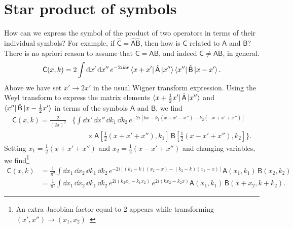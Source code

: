 \section{Star product of symbols}

How can we express the symbol of the product of two operators in terms of their individual symbols?
For example, if $\hat{\mathsf{C}} = \hat{\mathsf{A}}\hat{\mathsf{B}}$, then how is $\mathsf{C}$ related to $\mathsf{A}$ and $\mathsf{B}$?
There is no apriori reason to assume that $\mathsf{C} = \mathsf{A}\mathsf{B}$, and indeed $\mathsf{C} \neq \mathsf{A}\mathsf{B}$, in general.
%
\begin{equation}
  \mathsf{C}(x, k) = 2\int \mathrm{d}{x'}\, \mathrm{d}{x''} \,e^{-2ikx} \mathinner{\langle{x + x'}\rvert}\hat{\mathsf{A}}\mathinner{\lvert{x''}\rangle}\mathinner{\langle{x''}\rvert}\hat{\mathsf{B}}\mathinner{\lvert{x - x'}\rangle}.
\end{equation}
%
Above we have set $x' \to 2x'$ in the usual Wigner transform expression.
Using the Weyl transform to express the matrix elements $\mathinner{\langle{x + \frac{1}{2}x'}\rvert}\hat{\mathsf{A}}\mathinner{\lvert{x''}\rangle}$ and $\mathinner{\langle{x''}\rvert}\hat{\mathsf{B}}\mathinner{\lvert{x - \frac{1}{2}x'}\rangle}$ in terms of the symbols $\mathsf{A}$ and $\mathsf{B}$, we find
%
\begin{equation}
  \begin{aligned}
    \mathsf{C}(x, k) = \frac{2}{(2\pi)^{2}}& \bigg\{\int \dd{x'}\, \dd{x''}\, \dd{k_{1}}\, \dd{k_{2}}\,e^{-2i[kx - k_{1}(x + x' - x'') - k_{2}(-x + x' + x'')]}\\
                                           &\qquad\times \mathsf{A}\left[\tfrac{1}{2}(x + x' + x''), k_{1}\right]\, \mathsf{B}\left[\tfrac{1}{2}(x - x' + x''), k_{2}\right]\bigg\}.
  \end{aligned}
\end{equation}
%
Setting $x_{1} = \frac{1}{2}(x + x' + x'')$ and $x_{2} = \frac{1}{2}(x - x' + x'')$ and changing variables, we find\footnote{An extra Jacobian factor equal to 2 appears while transforming $(x', x'') \to (x_{1}, x_{2})$~\cite[Eq.~(2.3.23) and Problem~2.3.8]{chaichian2001}}
%
\begin{equation}
  \begin{aligned}
    \mathsf{C}(x, k) &= \frac{1}{\pi^{2}} \int \dd{x_{1}}\, \dd{x_{2}}\, \dd{k_{1}}\, \dd{k_{2}}\,e^{-2i[(k_{1} - k)(x_{2} - x) - (k_{2} - k)(x_{1} - x)]} \mathsf{A}(x_{1}, k_{1})\, \mathsf{B}(x_{2}, k_{2})\\
                     &= \frac{1}{\pi^{2}} \int \dd{x_{1}}\, \dd{x_{2}}\, \dd{k_{1}}\, \dd{k_{2}}\,e^{2i(k_{2}x_{1} - k_{1}x_{2})}\,e^{2i(kx_{2} - k_{2}x)} \mathsf{A}(x_{1}, k_{1})\, \mathsf{B}(x + x_{2}, k + k_{2}).\label{eq:moyal1}
  \end{aligned}
\end{equation}
